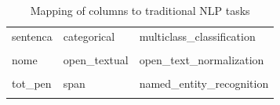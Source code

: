 \documentclass[
  12pt,
]{article}
\begin{document}
\begin{longtable}[t]{>{\raggedright\arraybackslash}p{15em}>{\raggedright\arraybackslash}p{17em}>{\raggedright\arraybackslash}p{17em}}
sentenca & categorical & multiclass\_classification\\
\cellcolor{gray!10}{juiz} & \cellcolor{gray!10}{open\_textual} & \cellcolor{gray!10}{open\_text\_normalization}\\
nome & open\_textual & open\_text\_normalization\\
\cellcolor{gray!10}{pena\_base} & \cellcolor{gray!10}{span} & \cellcolor{gray!10}{named\_entity\_recognition}\\
\addlinespace
tot\_pen & span & named\_entity\_recognition\\
\bottomrule


\caption{\label{tbl-nlp-task}Mapping of columns to traditional NLP
tasks}

\tabularnewline
\end{longtable}

\endgroup{}
\end{document}
